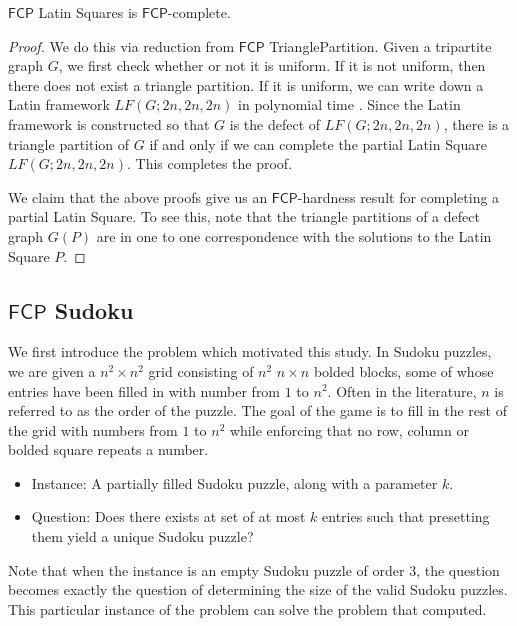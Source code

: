 \documentclass[runningheads,a4paper]{llncs}
\begin{document}
\begin{theorem}
$\mathsf{FCP}$ Latin Squares is $\mathsf{FCP}$-complete.
\end{theorem}

\begin{proof}
We do this via reduction from $\mathsf{FCP}$ TrianglePartition. Given a tripartite graph $G$, we first check whether or not it is uniform. If it is not uniform, then there does not exist a triangle partition. If it is uniform, we can write down a Latin framework $LF(G;2n,2n,2n)$ in polynomial time \cite{colbourn1984complexity}. Since the Latin framework is constructed so that $G$ is the defect of $LF(G;2n,2n,2n)$, there is a triangle partition of $G$ if and only if we can complete the partial Latin Square $LF(G;2n,2n,2n)$. This completes the proof.

We claim that the above proofs give us an $\mathsf{FCP}$-hardness result for completing a partial Latin Square. To see this, note that the triangle partitions of a defect graph $G(P)$ are in one to one correspondence with the solutions to the Latin Square $P$.
\end{proof}

\subsection{$\mathsf{FCP}$ Sudoku}

We first introduce the problem which motivated this study. In Sudoku puzzles, we are given a $n^2 \times n^2$ grid consisting of $n^2$ $n \times n$ bolded blocks, some of whose entries have been filled in with number from $1$ to $n^2$. Often in the literature, $n$ is referred to as the order of the puzzle. The goal of the game is to fill in the rest of the grid with numbers from $1$ to $n^2$ while enforcing that no row, column or bolded square repeats a number. 

\begin{itemize}
\item Instance: A partially filled Sudoku puzzle, along with a parameter $k$.
\item Question: Does there exists at set of at most $k$ entries such that presetting them yield a unique Sudoku puzzle?
\end{itemize}

Note that when the instance is an empty Sudoku puzzle of order 3, the question becomes exactly the question of determining the size of the valid Sudoku puzzles. This particular instance of the problem can solve the problem that \cite{mcguire2012there} computed. 
\end{document}
